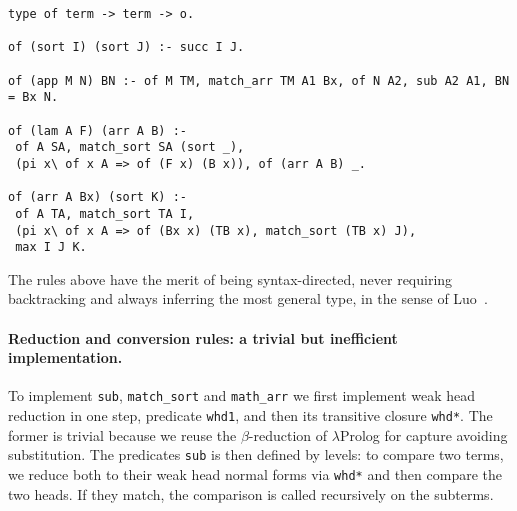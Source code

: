 \documentclass{easychair}
\begin{document}
\begin{Verbatim}
type of term -> term -> o.

of (sort I) (sort J) :- succ I J.

of (app M N) BN :- of M TM, match_arr TM A1 Bx, of N A2, sub A2 A1, BN = Bx N.

of (lam A F) (arr A B) :-
 of A SA, match_sort SA (sort _),
 (pi x\ of x A => of (F x) (B x)), of (arr A B) _.

of (arr A Bx) (sort K) :-
 of A TA, match_sort TA I,
 (pi x\ of x A => of (Bx x) (TB x), match_sort (TB x) J),
 max I J K.
\end{Verbatim}

The rules above have the merit of being syntax-directed, never requiring backtracking and always inferring the most general type, in the sense of Luo~\cite{ecc}.
% 
% 
% 

\paragraph{Reduction and conversion rules: a trivial but inefficient implementation. }\label{sec:inefficient}
To implement \verb+sub+, \verb+match_sort+ and
\verb+math_arr+ we first implement weak head
reduction in one step, predicate \verb+whd1+, and then 
its transitive closure \verb+whd*+.
The former is trivial because we reuse the $\beta$-reduction of $\lambda$Prolog for capture avoiding substitution. The predicates \verb+sub+ is then defined by levels: to compare two terms, we reduce both to their weak head normal forms via \verb+whd*+ and then compare the two heads. If they match, the comparison is called recursively on the subterms.
\end{document}

